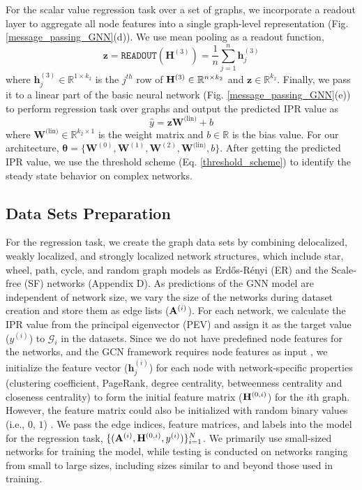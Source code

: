 \documentclass[aps, prd, showpacs, floatfix, superscriptaddress, twocolumn, nofootinbib, preprintnumbers, longbibliography]{revtex4-2}
\begin{document}
\vspace{2mm}
For the scalar value regression task over a set of graphs, we incorporate a readout layer to aggregate all node features into a single graph-level representation (Fig. \ref{message_passing_GNN}(d)). We use mean pooling as a readout function, 
\begin{equation}
\nonumber
\bm{z} = \texttt{READOUT}(\mathbf{H}^{(3)})= \frac{1}{n} \sum_{j=1}^{n} \bm{h}^{(3)}_j 
\end{equation}
where $\bm{h}^{(3)}_j \in \mathbb{R}^{1 \times k_2}$ is the $j^{th}$ row of ${\bf H}^{(3)} \in \mathbb{R}^{n \times k_2}$ and $\bm{z} \in \mathbb{R}^{k_2}$. Finally, we pass it to a linear part of the basic neural network (Fig. \ref{message_passing_GNN}(e)) to perform regression task over graphs and output the predicted IPR value as  
\begin{equation}\nonumber
\hat{y} = \bm{z} \mathbf{W}^{\text{(lin)}}+b    
\end{equation}
where $\mathbf{W}^{\text{(lin)}} \in \mathbb{R}^{k_2 \times 1}$ is the weight matrix and $b \in \mathbb{R}$ is the bias value. For our architecture, $\bm{\theta}=\{ \mathbf{W}^{(0)},\mathbf{W}^{(1)},\mathbf{W}^{(2)},\mathbf{W}^{\text{(lin)}}, b \}$. After getting the predicted IPR value, we use the threshold scheme (Eq. \ref{threshold_scheme}) to identify the steady state behavior on complex networks.
\subsection{Data Sets Preparation}
For the regression task, we create the graph data sets by combining delocalized, weakly localized, and strongly localized network structures, which include star, wheel, path, cycle, and random graph models as Erd\H{o}s-R\'enyi (ER) and the Scale-free (SF) networks (Appendix D). As predictions of the GNN model are independent of network size, we vary the size of the networks during dataset creation and store them as edge lists (${\bf A}^{(i)}$). For each network, we calculate the IPR value from the principal eigenvector (PEV) and assign it as the target value ($y^{(i)}$) to $\mathcal{G}_i$ in the datasets. Since we do not have predefined node features for the networks, and the GCN framework requires node features as input \cite{hamilton2020graph}, we initialize the feature vector ($\bm{h}_j^{(i)}$) for each node with network-specific properties (clustering coefficient, PageRank, degree centrality, betweenness centrality and closeness centrality) to form the initial feature matrix (${\bf H}^{(0, i)}$) for the $i$th graph. However, the feature matrix could also be initialized with random binary values (i.e., $0$, $1$) \cite{hamilton2020graph}. We pass the edge indices, feature matrices, and labels into the model for the regression task, $\{({\bf A}^{(i)},{\bf H}^{(0,i)}, y^{(i)})\}_{i=1}^{N}$. We primarily use small-sized networks for training the model, while testing is conducted on networks ranging from small to large sizes, including sizes similar to and beyond those used in training. 
\end{document}
